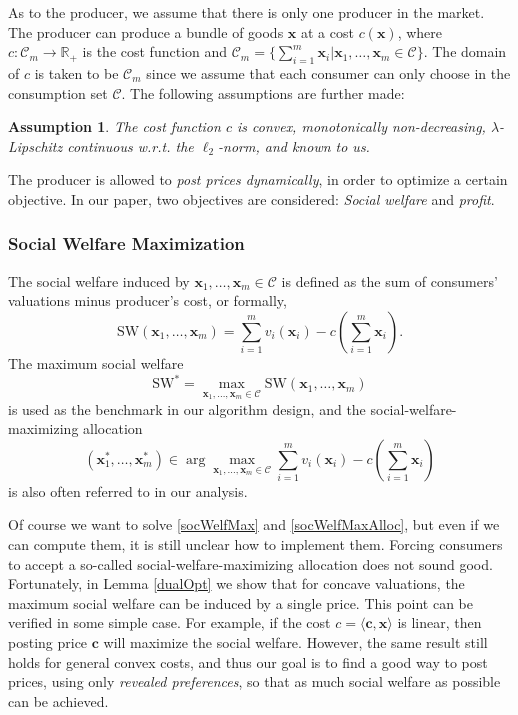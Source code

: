 \documentclass{article}
\newtheorem{assumption}{Assumption}[section]
\begin{document}
As to the producer, we assume that there is only one producer in the market. The producer can produce a bundle of goods $\mathbf{x}$ at a cost $c(\mathbf{x})$, where $c:\mathcal{C}_m\to\mathbb{R}_+$ is the cost function and $\mathcal{C}_m=\{\sum_{i=1}^{m}\mathbf{x}_i|\mathbf{x}_1,\ldots,\mathbf{x}_m\!\in\!\mathcal{C}\}$. The domain of $c$ is taken to be $\mathcal{C}_m$ since we assume that each consumer can only choose in the consumption set $\mathcal{C}$. The following assumptions are further made:
\begin{assumption}\label{cost}
    The cost function $c$ is convex, monotonically non-decreasing, $\lambda$-Lipschitz continuous w.r.t. the $\ell_2$-norm, and known to us.
\end{assumption}

The producer is allowed to \emph{post prices dynamically}, in order to optimize a certain objective. In our paper, two objectives are considered: \emph{Social welfare} and \emph{profit}.

\subsubsection{Social Welfare Maximization}
The social welfare induced by $\mathbf{x}_1,\ldots,\mathbf{x}_m\in \mathcal{C}$ is defined as the sum of consumers' valuations minus producer's cost, or formally,
\begin{equation}\label{socWelf}
    \mathrm{SW}(\mathbf{x}_1,\ldots,\mathbf{x}_m)=\sum_{i=1}^{m}v_i(\mathbf{x}_i)-c\left(\sum_{i=1}^{m}\mathbf{x}_i\right).
\end{equation}
The maximum social welfare
\begin{equation}\label{socWelfMax}
    \mathrm{SW}^*=\max_{\mathbf{x}_1,\ldots,\mathbf{x}_m\in \mathcal{C}}\mathrm{SW}(\mathbf{x}_1,\ldots,\mathbf{x}_m)
\end{equation}
is used as the benchmark in our algorithm design, and the social-welfare-maximizing allocation
\begin{equation}\label{socWelfMaxAlloc}
    (\mathbf{x}_1^*,\ldots,\mathbf{x}_m^*)\in\arg\max_{\mathbf{x}_1,\ldots,\mathbf{x}_m\in \mathcal{C}}\sum_{i=1}^{m}v_i(\mathbf{x}_i)-c\left(\sum_{i=1}^{m}\mathbf{x}_i\right)
\end{equation}
is also often referred to in our analysis.

Of course we want to solve \eqref{socWelfMax} and \eqref{socWelfMaxAlloc}, but even if we can compute them, it is still unclear how to implement them. Forcing consumers to accept a so-called social-welfare-maximizing allocation does not sound good. Fortunately, in Lemma \ref{dualOpt} we show that for concave valuations, the maximum social welfare can be induced by a single price. This point can be verified in some simple case. For example, if the cost $c=\langle \mathbf{c},\mathbf{x}\rangle$ is linear, then posting price $\mathbf{c}$ will maximize the social welfare. However, the same result still holds for general convex costs, and thus our goal is to find a good way to post prices, using only \emph{revealed preferences}, so that as much social welfare as possible can be achieved.
\end{document}
